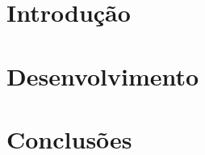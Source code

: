 \documentclass[
	12pt,				%
	openright,			%
	oneside,			%
	a4paper,			%
	chapter=TITLE,		%
	english,			%
	french,				%
	spanish,			%
	brazil				%
	]{abntex2}
\begin{document}


\textual
\pagestyle{chapter}

\chapter[Introdução]{Introdução}





\chapter[Desenvolvimento]{Desenvolvimento}



\chapter[Conclusões]{Conclusões}



\postextual



%
%

\end{document}
